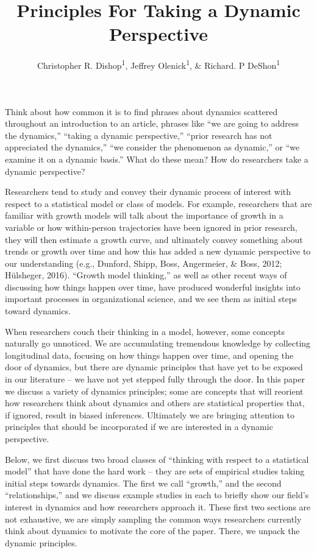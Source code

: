 \documentclass[english,,man]{apa6}
\title{Principles For Taking a Dynamic Perspective}
\author{Christopher R. Dishop\textsuperscript{1}, Jeffrey
Olenick\textsuperscript{1}, \& Richard. P DeShon\textsuperscript{1}}
\date{}
\affiliation{
\vspace{0.5cm}
\textsuperscript{1} Michigan State University}
\theoremstyle{definition}
\theoremstyle{definition}
\theoremstyle{definition}
\theoremstyle{remark}
\begin{document}
\maketitle

Think about how common it is to find phrases about dynamics scattered
throughout an introduction to an article, phrases like \enquote{we are
going to address the dynamics,} \enquote{taking a dynamic perspective,}
\enquote{prior research has not appreciated the dynamics,} \enquote{we
consider the phenomenon as dynamic,} or \enquote{we examine it on a
dynamic basis.} What do these mean? How do researchers take a dynamic
perspective?

Researchers tend to study and convey their dynamic process of interest
with respect to a statistical model or class of models. For example,
researchers that are familiar with growth models will talk about the
importance of growth in a variable or how within-person trajectories
have been ignored in prior research, they will then estimate a growth
curve, and ultimately convey something about trends or growth over time
and how this has added a new dynamic perspective to our understanding
(e.g., Dunford, Shipp, Boss, Angermeier, \& Boss, 2012; Hülsheger,
2016). \enquote{Growth model thinking,} as well as other recent ways of
discussing how things happen over time, have produced wonderful insights
into important processes in organizational science, and we see them as
initial steps toward dynamics.

When researchers couch their thinking in a model, however, some concepts
naturally go unnoticed. We are accumulating tremendous knowledge by
collecting longitudinal data, focusing on how things happen over time,
and opening the door of dynamics, but there are dynamic principles that
have yet to be exposed in our literature -- we have not yet stepped
fully through the door. In this paper we discuss a variety of dynamics
principles; some are concepts that will reorient how researchers think
about dynamics and others are statistical properties that, if ignored,
result in biased inferences. Ultimately we are bringing attention to
principles that should be incorporated if we are interested in a dynamic
perspective.

Below, we first discuss two broad classes of \enquote{thinking with
respect to a statistical model} that have done the hard work -- they are
sets of empirical studies taking initial steps towards dynamics. The
first we call \enquote{growth,} and the second \enquote{relationships,}
and we discuss example studies in each to briefly show our field's
interest in dynamics and how researchers approach it. These first two
sections are not exhaustive, we are simply sampling the common ways
researchers currently think about dynamics to motivate the core of the
paper. There, we unpack the dynamic principles.
\end{document}
